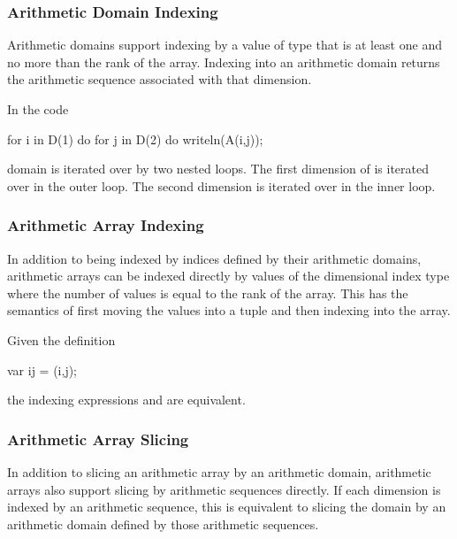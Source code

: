 \subsubsection{Arithmetic Domain Indexing}
\label{Arithmetic_Domain_Indexing}

Arithmetic domains support indexing by a value of type  that
is at least one and no more than the rank of the array.  Indexing into
an arithmetic domain returns the arithmetic sequence associated with
that dimension.

\begin{example}
In the code
\begin{chapel}
for i in D(1) do
  for j in D(2) do
    writeln(A(i,j));
\end{chapel}
domain  is iterated over by two nested loops.  The first
dimension of  is iterated over in the outer loop.  The second
dimension is iterated over in the inner loop.
\end{example}

\subsubsection{Arithmetic Array Indexing}
\label{Arithmetic_Array_Indexing}

In addition to being indexed by indices defined by their arithmetic
domains, arithmetic arrays can be indexed directly by values of the
dimensional index type where the number of values is equal to the rank
of the array.  This has the semantics of first moving the values into
a tuple and then indexing into the array.

\begin{example}
Given the definition
\begin{chapel}
  var ij = (i,j);
\end{chapel}
the indexing expressions  and  are
equivalent.
\end{example}

\subsubsection{Arithmetic Array Slicing}
\label{Arithmetic_Array_Slicing}

In addition to slicing an arithmetic array by an arithmetic domain,
arithmetic arrays also support slicing by arithmetic sequences
directly.  If each dimension is indexed by an arithmetic sequence,
this is equivalent to slicing the domain by an arithmetic domain
defined by those arithmetic sequences.

